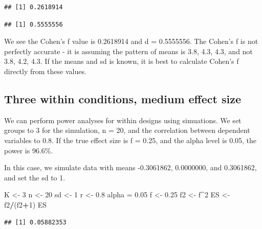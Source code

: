 \documentclass[]{book}
\newenvironment{Shaded}{\begin{snugshade}}{\end{snugshade}}
\newcommand{\DecValTok}[1]{\textcolor[rgb]{0.00,0.00,0.81}{#1}}
\newcommand{\FloatTok}[1]{\textcolor[rgb]{0.00,0.00,0.81}{#1}}
\newcommand{\NormalTok}[1]{#1}
\newcommand{\OperatorTok}[1]{\textcolor[rgb]{0.81,0.36,0.00}{\textbf{#1}}}
\newcommand{\StringTok}[1]{\textcolor[rgb]{0.31,0.60,0.02}{#1}}
\begin{document}
\begin{verbatim}
## [1] 0.2618914
\end{verbatim}

\begin{Shaded}
\end{Shaded}

\begin{verbatim}
## [1] 0.5555556
\end{verbatim}

We see the Cohen's f value is 0.2618914 and d = 0.5555556. The Cohen's f is not perfectly accurate - it is assuming the pattern of means is 3.8, 4.3, 4.3, and not 3.8, 4.2, 4.3. If the means and sd is known, it is best to calculate Cohen's f directly from these values.

\hypertarget{three-within-conditions-medium-effect-size}{%
\subsection{Three within conditions, medium effect size}\label{three-within-conditions-medium-effect-size}}

We can perform power analyses for within designs using simuations. We set groups to 3 for the simulation, n = 20, and the correlation between dependent variables to 0.8. If the true effect size is f = 0.25, and the alpha level is 0.05, the power is 96.6\%.

In this case, we simulate data with means -0.3061862, 0.0000000, and 0.3061862, and set the sd to 1.

\begin{Shaded}
\begin{Highlighting}[]
\NormalTok{K <-}\StringTok{ }\DecValTok{3}
\NormalTok{n <-}\StringTok{ }\DecValTok{20}
\NormalTok{sd <-}\StringTok{ }\DecValTok{1}
\NormalTok{r <-}\StringTok{ }\FloatTok{0.8}
\NormalTok{alpha =}\StringTok{ }\FloatTok{0.05}
\NormalTok{f <-}\StringTok{ }\FloatTok{0.25}
\NormalTok{f2 <-}\StringTok{ }\NormalTok{f}\OperatorTok{^}\DecValTok{2}
\NormalTok{ES <-}\StringTok{ }\NormalTok{f2}\OperatorTok{/}\NormalTok{(f2}\OperatorTok{+}\DecValTok{1}\NormalTok{)}
\NormalTok{ES}
\end{Highlighting}
\end{Shaded}

\begin{verbatim}
## [1] 0.05882353
\end{verbatim}
\end{document}
